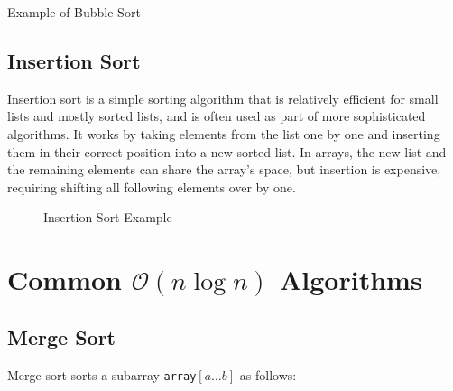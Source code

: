 \documentclass[twoside,12pt,a4paper,english]{book}
\theoremstyle{definition}
\theoremstyle{problemstyle}
\theoremstyle{problemstyle}
\theoremstyle{problemstyle}
\begin{document}
\begin{center}

Example of Bubble Sort
\end{center}
\subsection{Insertion Sort}
Insertion sort is a simple sorting algorithm that is relatively efficient for small lists and mostly sorted lists, and is often used as part of more sophisticated algorithms. It works by taking elements from the list one by one and inserting them in their correct position into a new sorted list. In arrays, the new list and the remaining elements can share the array's space, but insertion is expensive, requiring shifting all following elements over by one.

\begin{figure}[htbp]
  \centering
  

  Insertion Sort Example
\end{figure}

\section{Common \texorpdfstring{$\mathcal{O}(n\log{n})$}{O(nlog(n))} Algorithms}
\subsection{Merge Sort}
Merge sort sorts a subarray \texttt{array}$[a \ldots b]$ as follows:
\end{document}
